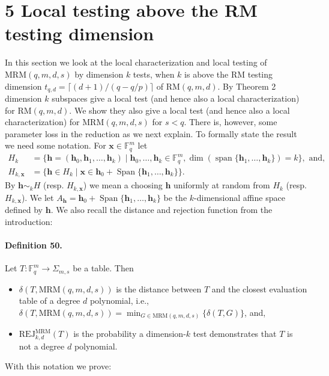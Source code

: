 \section*{5 Local testing above the RM testing dimension}
In this section we look at the local characterization and local testing of $\mathrm{MRM}(q,m,d,s)$ by dimension $k$ tests, when $k$ is above the RM testing dimension $t_{q,d}=\lceil(d+1)/(q-q/p)\rceil$ of $\mathrm{RM}(q,m,d)$. By Theorem 2 dimension $k$ subspaces give a local test (and hence also a local characterization) for $\mathrm{RM}(q,m,d)$. We show they also give a local test (and hence also a local characterization) for $\mathrm{MRM}(q,m,d,s)$ for $s<q$. There is, however, some parameter loss in the reduction as we next explain. To formally state the result we need some notation. For $\boldsymbol x\in\mathbb F_q^m$ let
\begin{align*}
H_k&=\{\boldsymbol h=(\boldsymbol h_0,\boldsymbol h_1,\ldots,\boldsymbol h_k)\mid\boldsymbol h_0,\ldots,\boldsymbol h_k\in\mathbb F_q^m,\dim(\operatorname{span}\{\boldsymbol h_1,\ldots,\boldsymbol h_k\})=k\},\text{ and,}\\
H_{k,\boldsymbol x}&=\{\boldsymbol h\in H_k\mid\boldsymbol x\in\boldsymbol h_0+\operatorname{Span}\{\boldsymbol h_1,\ldots,\boldsymbol h_k\}\}.
\end{align*}
By $\boldsymbol h\sim_kH$ (resp. $H_{k,\boldsymbol x}$) we mean a choosing $\boldsymbol h$ uniformly at random from $H_k$ (resp. $H_{k,\boldsymbol x}$). We let $A_{\boldsymbol h}=\boldsymbol h_0+\operatorname{Span}\{\boldsymbol h_1,\ldots,\boldsymbol h_k\}$ be the $k$-dimensional affine space defined by $\boldsymbol h$. We also recall the distance and rejection function from the introduction:
\paragraph{Definition 50.} Let $T:\mathbb F_q^m\to\Sigma_{m,s}$ be a table. Then
\begin{itemize}
\item $\delta(T,\mathrm{MRM}(q,m,d,s))$ is the distance between $T$ and the closest evaluation table of a degree $d$ polynomial, i.e., $\delta(T,\mathrm{MRM}(q,m,d,s))=\min_{G\in\mathrm{MRM}(q,m,d,s)}\{\delta(T,G)\}$, and,
\item $\mathrm{REJ}_{k,d}^{\mathrm{MRM}}(T)$ is the probability a dimension-$k$ test demonstrates that $T$ is not a degree $d$ polynomial.
\end{itemize}
With this notation we prove:
